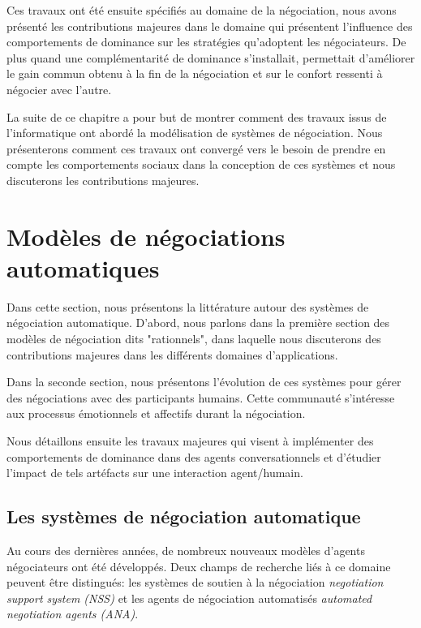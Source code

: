 		Ces travaux ont été ensuite spécifiés au domaine de la négociation, nous avons présenté les contributions majeures dans le domaine qui présentent l'influence des comportements de dominance sur les stratégies qu'adoptent les négociateurs. De plus quand une complémentarité de dominance s'installait, permettait d'améliorer le gain commun obtenu à la fin de la négociation et sur le confort ressenti à négocier avec l'autre.
		
		La suite de ce chapitre a pour but de montrer comment des travaux issus de l'informatique ont abordé la modélisation de systèmes de négociation. Nous présenterons comment ces travaux ont convergé vers le besoin de prendre en compte les comportements sociaux dans la conception de ces systèmes et nous discuterons les contributions majeures.  
		
		
		
		
		
	
	
		\section{Modèles de négociations automatiques}
		
		Dans cette section, nous présentons la littérature autour des systèmes de négociation automatique. D'abord, nous parlons dans la première section des modèles de négociation dits "rationnels", dans laquelle nous discuterons des contributions majeures dans les différents domaines d'applications. 
		
		Dans la seconde section, nous présentons l'évolution de ces systèmes pour gérer des négociations avec des participants humains. Cette communauté s'intéresse aux processus émotionnels et affectifs durant la négociation. 
		
		Nous détaillons ensuite les travaux majeures qui visent à implémenter des comportements de dominance dans des agents conversationnels et d'étudier l'impact de tels artéfacts sur une interaction agent/humain. 
		
		\subsection{Les systèmes de négociation automatique}
		
		Au cours des dernières années, de nombreux nouveaux modèles d'agents négociateurs ont été développés. Deux champs de recherche liés à ce domaine peuvent être distingués: les systèmes de soutien à la négociation \emph{ negotiation support system (NSS)} et les agents de négociation automatisés \emph{automated negotiation agents (ANA)}.
		
